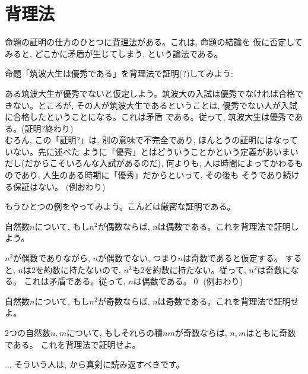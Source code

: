\section{背理法}

命題の証明の仕方のひとつに\underline{背理法}がある。これは, 命題の結論を
仮に否定してみると, どこかに矛盾が生じてしまう, という論法である。

\begin{exmpl}
命題「筑波大生は優秀である」を背理法で証明(?)してみよう: 

ある筑波大生が優秀でないと仮定しよう。筑波大の入試は優秀でなければ合格できない。ところが, 
その人が筑波大生であるということは, 優秀でない人が入試に合格したということになる。これは矛盾
である。従って, 筑波大生は優秀である。(証明?終わり)\\

むろん, この「証明?」は, 別の意味で不完全であり, ほんとうの証明にはなっていない。先に述べた
ように「優秀」とはどういうことかという定義があいまいだし(だからこそいろんな入試があるのだ), 
何よりも, 人は時間によってかわるものであり, 人生のある時期に「優秀」だからといって, その後も
そうであり続ける保証はない。
(例おわり)\end{exmpl}
\mv

もうひとつの例をやってみよう。こんどは厳密な証明である。\\

\begin{exmpl}
自然数$n$について, もし$n^2$が偶数ならば, $n$は偶数である。これを背理法で証明しよう。

$n^2$が偶数でありながら, $n$が偶数でない, つまり$n$は奇数であると仮定する。
すると, $n$は2を約数に持たないので, $n^2$も2を約数に持たない。従って, $n^2$は奇数になる。
これは矛盾である。従って, $n$は偶数である。\qed
(例おわり)\end{exmpl}
\mv


\begin{q}\label{q:logic_oddeven0}
自然数$n$について, もし$n^2$が奇数ならば, $n$は奇数である。これを背理法で証明せよ。
\end{q}
\mv

\begin{q}\label{q:logic_oddadd}
2つの自然数$n, m$について, もしそれらの積$nm$が奇数ならば, $n, m$はともに奇数である。
これを背理法で証明せよ。
\end{q}

\begin{freqmiss}{\small{} ... そういう人は, 
から真剣に読み返すべきです。}\end{freqmiss}\mv

